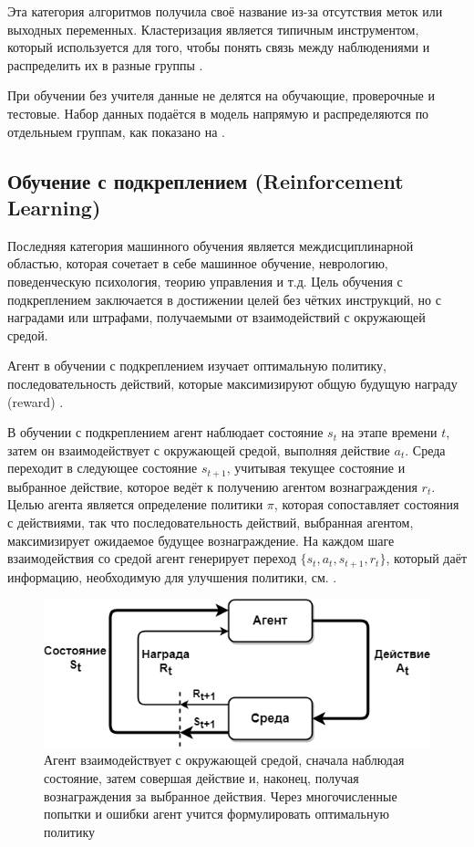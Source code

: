 Эта категория алгоритмов получила своё название из-за отсутствия меток или выходных переменных. Кластеризация является типичным инструментом, который используется для того, чтобы понять связь между наблюдениями и распределить их в разные группы \cite{hastie2001elements}.

При обучении без учителя данные не делятся на обучающие, проверочные и тестовые. Набор данных подаётся в модель напрямую и распределяются по отдельныем группам, как показано на .


\subsection{Обучение с подкреплением (Reinforcement Learning)}

Последняя категория машинного обучения является междисциплинарной областью, которая сочетает в себе машинное обучение, неврологию, поведенческую психология, теорию управления и т.д. Цель обучения с подкреплением заключается в достижении целей без чётких инструкций, но с наградами или штрафами, получаемыми от взаимодействий с окружающей средой.

Агент в обучении с подкреплением изучает оптимальную политику, последовательность действий, которые максимизируют общую будущую награду (reward) \cite{SuttonAndBarto-RL-Introduction-p2}.

В обучении с подкреплением агент наблюдает состояние ${s_t}$ на этапе времени ${t}$, затем он взаимодействует с окружающей средой, выполняя действие ${a_t}$. Среда переходит в следующее состояние ${s_{t+1}}$, учитывая текущее состояние и выбранное действие, которое ведёт к получению агентом вознаграждения ${r_t}$. Целью агента является определение политики $\pi$, которая сопоставляет состояния с действиями, так что последовательность действий, выбранная агентом, максимизирует ожидаемое будущее вознаграждение. На каждом шаге взаимодействия со средой агент генерирует переход ${\{s_t, a_t, s_{t+1}, r_t\}}$, который даёт информацию, необходимую для улучшения политики, см. .

\begin{figure}[ht!] 
	\center
	\includegraphics [scale=0.60] {my_folder/images/ch1/rl-flow.png}
	\caption{Агент взаимодействует с окружающей средой, сначала наблюдая состояние, затем совершая действие и, наконец, получая вознаграждения за выбранное действия. Через многочисленные попытки и ошибки агент учится формулировать оптимальную политику \cite{SuttonAndBarto-RL-Introduction-p50}} 
	\label{fig:ch1-RL-flow}
\end{figure}

